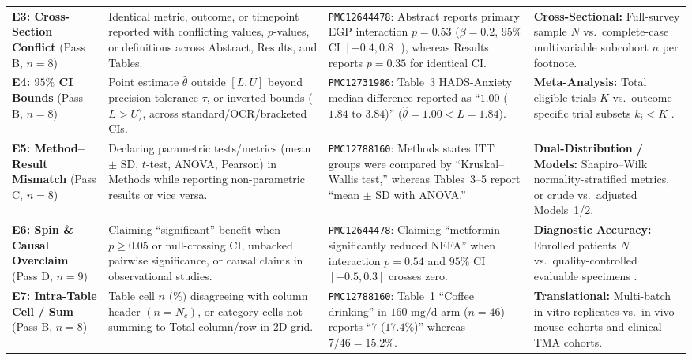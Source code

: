 \documentclass[11pt,a4paper]{article}
\begin{document}
\begin{table}[!t]
\begin{tabularx}{\textwidth}{@{}>{\raggedright\arraybackslash}p{2.25cm}>{\raggedright\arraybackslash}p{4.25cm}>{\raggedright\arraybackslash}X>{\raggedright\arraybackslash}p{3.85cm}@{}}
\addlinespace[2.5pt]
\textbf{E3: Cross-Section Conflict} (Pass B, $n=8$) & Identical metric, outcome, or timepoint reported with conflicting values, $p$-values, or definitions across Abstract, Results, and Tables. & \texttt{PMC12644478}: Abstract reports primary EGP interaction $p = 0.53$ ($\beta = 0.2$, $95\%$ CI $[-0.4, 0.8]$), whereas Results reports $p = 0.35$ for identical CI. & \textbf{Cross-Sectional:} Full-survey sample $N$ vs.\ complete-case multivariable subcohort $n$ per footnote. \\
\addlinespace[2.5pt]
\textbf{E4: $95\%$ CI Bounds} (Pass B, $n=8$) & Point estimate $\hat{\theta}$ outside $[L, U]$ beyond precision tolerance $\tau$, or inverted bounds ($L > U$), across standard/OCR/bracketed CIs. & \texttt{PMC12731986}: Table~3 HADS-Anxiety median difference reported as ``$1.00$ ($1.84$ to $3.84$)'' ($\hat{\theta}=1.00 < L=1.84$). & \textbf{Meta-Analysis:} Total eligible trials $K$ vs.\ outcome-specific trial subsets $k_i < K$ \cite{page2021prisma}. \\
\addlinespace[2.5pt]
\textbf{E5: Method--Result Mismatch} (Pass C, $n=8$) & Declaring parametric tests/metrics (mean $\pm$ SD, $t$-test, ANOVA, Pearson) in Methods while reporting non-parametric results or vice versa. & \texttt{PMC12788160}: Methods states ITT groups were compared by ``Kruskal--Wallis test,'' whereas Tables~3--5 report ``mean $\pm$ SD with ANOVA.'' & \textbf{Dual-Distribution / Models:} Shapiro--Wilk normality-stratified metrics, or crude vs.\ adjusted Models~1/2. \\
\addlinespace[2.5pt]
\textbf{E6: Spin \& Causal Overclaim} (Pass D, $n=9$) & Claiming ``significant'' benefit when $p \ge 0.05$ or null-crossing CI, unbacked pairwise significance, or causal claims in observational studies. & \texttt{PMC12644478}: Claiming ``metformin significantly reduced NEFA'' when interaction $p = 0.54$ and $95\%$ CI $[-0.5, 0.3]$ crosses zero. & \textbf{Diagnostic Accuracy:} Enrolled patients $N$ vs.\ quality-controlled evaluable specimens \cite{bossuyt2015stard}. \\
\addlinespace[2.5pt]
\textbf{E7: Intra-Table Cell / Sum} (Pass B, $n=8$) & Table cell $n\text{ (\%)}$ disagreeing with column header $(n=N_c)$, or category cells not summing to Total column/row in 2D grid. & \texttt{PMC12788160}: Table~1 ``Coffee drinking'' in $160\text{ mg/d}$ arm ($n=46$) reports ``$7$ ($17.4\%$)'' whereas $7/46 = 15.2\%$. & \textbf{Translational:} Multi-batch in vitro replicates vs.\ in vivo mouse cohorts and clinical TMA cohorts. \\
\bottomrule
\end{tabularx}
\end{table}
\end{document}
